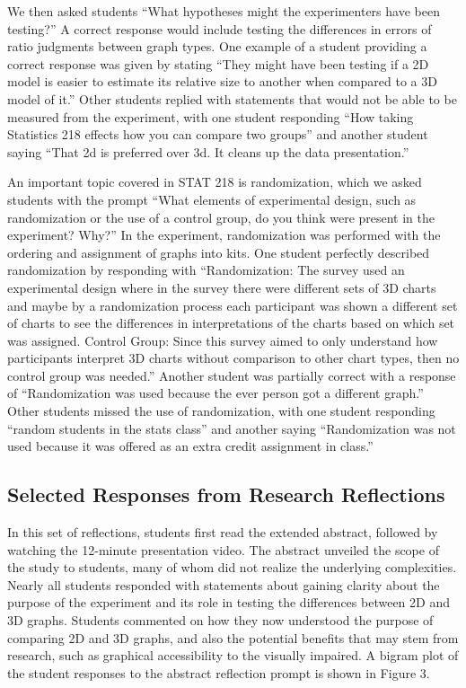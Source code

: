 \documentclass[
  12pt,
]{article}
\begin{document}
We then asked students ``What hypotheses might the experimenters have
been testing?'' A correct response would include testing the differences
in errors of ratio judgments between graph types. One example of a
student providing a correct response was given by stating ``They might
have been testing if a 2D model is easier to estimate its relative size
to another when compared to a 3D model of it.'' Other students replied
with statements that would not be able to be measured from the
experiment, with one student responding ``How taking Statistics 218
effects how you can compare two groups'' and another student saying
``That 2d is preferred over 3d. It cleans up the data presentation.''

An important topic covered in STAT 218 is randomization, which we asked
students with the prompt ``What elements of experimental design, such as
randomization or the use of a control group, do you think were present
in the experiment? Why?'' In the experiment, randomization was performed
with the ordering and assignment of graphs into kits. One student
perfectly described randomization by responding with ``Randomization:
The survey used an experimental design where in the survey there were
different sets of 3D charts and maybe by a randomization process each
participant was shown a different set of charts to see the differences
in interpretations of the charts based on which set was assigned.
Control Group: Since this survey aimed to only understand how
participants interpret 3D charts without comparison to other chart
types, then no control group was needed.'' Another student was partially
correct with a response of ``Randomization was used because the ever
person got a different graph.'' Other students missed the use of
randomization, with one student responding ``random students in the
stats class'' and another saying ``Randomization was not used because it
was offered as an extra credit assignment in class.''

\subsection{Selected Responses from Research
Reflections}\label{selected-responses-from-research-reflections}

In this set of reflections, students first read the extended abstract,
followed by watching the 12-minute presentation video. The abstract
unveiled the scope of the study to students, many of whom did not
realize the underlying complexities. Nearly all students responded with
statements about gaining clarity about the purpose of the experiment and
its role in testing the differences between 2D and 3D graphs. Students
commented on how they now understood the purpose of comparing 2D and 3D
graphs, and also the potential benefits that may stem from research,
such as graphical accessibility to the visually impaired. A bigram plot
of the student responses to the abstract reflection prompt is shown in
Figure 3.
\end{document}
